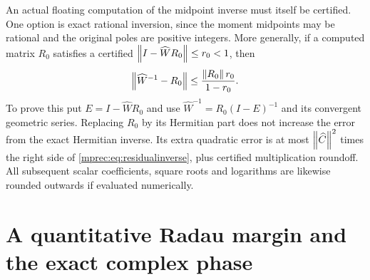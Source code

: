 \documentclass[11pt]{article}
\begin{document}
An actual floating computation of the midpoint inverse must itself
be certified. One option is exact rational inversion, since the
moment midpoints may be rational and the original poles are positive
integers. More generally, if a computed matrix $R_0$ satisfies a
certified $\left\lVert I-\widehat W R_0\right\rVert\le r_0<1$, then
\begin{equation}\label{mprec:eq:residualinverse}
 \left\lVert\widehat W^{-1}-R_0\right\rVert
 \le\frac{\left\lVert R_0\right\rVert r_0}{1-r_0}.
\end{equation}
To prove this put $E=I-\widehat W R_0$ and use
$\widehat W^{-1}=R_0(I-E)^{-1}$ and its convergent geometric
series. Replacing $R_0$ by its Hermitian part does not increase
the error from the exact Hermitian inverse. Its extra quadratic
error is at most $\left\lVert\widehat C\right\rVert^2$ times the right side of
\eqref{mprec:eq:residualinverse}, plus certified multiplication roundoff.
All subsequent scalar coefficients, square roots and logarithms are
likewise rounded outwards if evaluated numerically.

\section{A quantitative Radau margin and the exact complex phase}
\end{document}
